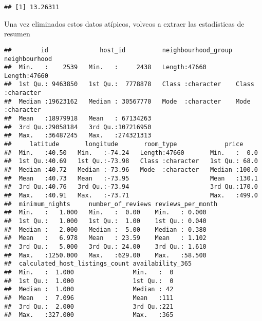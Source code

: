 \documentclass[
]{book}
\newenvironment{Shaded}{\begin{snugshade}}{\end{snugshade}}
\newcommand{\DecValTok}[1]{\textcolor[rgb]{0.00,0.00,0.81}{#1}}
\newcommand{\FunctionTok}[1]{\textcolor[rgb]{0.00,0.00,0.00}{#1}}
\newcommand{\NormalTok}[1]{#1}
\newcommand{\OtherTok}[1]{\textcolor[rgb]{0.56,0.35,0.01}{#1}}
\newcommand{\SpecialCharTok}[1]{\textcolor[rgb]{0.00,0.00,0.00}{#1}}
\begin{document}
\begin{verbatim}
## [1] 13.26311
\end{verbatim}

Una vez eliminados estos datos atípicos, volveos a extraer las estadísticas de resumen

\begin{Shaded}
\end{Shaded}

\begin{verbatim}
##        id              host_id          neighbourhood_group neighbourhood     
##  Min.   :    2539   Min.   :     2438   Length:47660        Length:47660      
##  1st Qu.: 9463850   1st Qu.:  7778878   Class :character    Class :character  
##  Median :19623162   Median : 30567770   Mode  :character    Mode  :character  
##  Mean   :18979918   Mean   : 67134263                                         
##  3rd Qu.:29058184   3rd Qu.:107216950                                         
##  Max.   :36487245   Max.   :274321313                                         
##     latitude       longitude       room_type             price      
##  Min.   :40.50   Min.   :-74.24   Length:47660       Min.   :  0.0  
##  1st Qu.:40.69   1st Qu.:-73.98   Class :character   1st Qu.: 68.0  
##  Median :40.72   Median :-73.96   Mode  :character   Median :100.0  
##  Mean   :40.73   Mean   :-73.95                      Mean   :130.1  
##  3rd Qu.:40.76   3rd Qu.:-73.94                      3rd Qu.:170.0  
##  Max.   :40.91   Max.   :-73.71                      Max.   :499.0  
##  minimum_nights     number_of_reviews reviews_per_month
##  Min.   :   1.000   Min.   :  0.00    Min.   : 0.000   
##  1st Qu.:   1.000   1st Qu.:  1.00    1st Qu.: 0.040   
##  Median :   2.000   Median :  5.00    Median : 0.380   
##  Mean   :   6.978   Mean   : 23.59    Mean   : 1.102   
##  3rd Qu.:   5.000   3rd Qu.: 24.00    3rd Qu.: 1.610   
##  Max.   :1250.000   Max.   :629.00    Max.   :58.500   
##  calculated_host_listings_count availability_365
##  Min.   :  1.000                Min.   :  0     
##  1st Qu.:  1.000                1st Qu.:  0     
##  Median :  1.000                Median : 42     
##  Mean   :  7.096                Mean   :111     
##  3rd Qu.:  2.000                3rd Qu.:221     
##  Max.   :327.000                Max.   :365
\end{verbatim}
\end{document}
